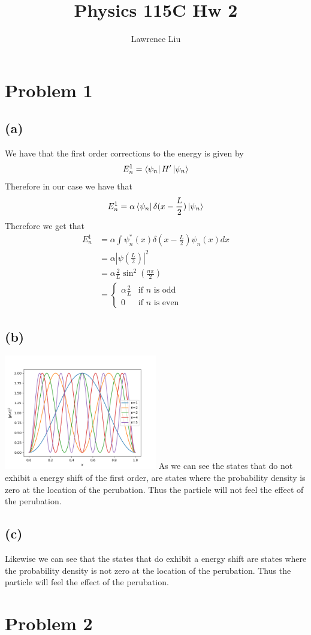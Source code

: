 \documentclass[11pt]{article}
\author{Lawrence Liu}
\title{Physics 115C Hw 2}
\begin{document}
\maketitle
\section*{Problem 1}
\subsection*{(a)}
We have that the first order corrections to the energy is given by 
$$
E_{n}^{1}=\bra{\psi_n}H'\ket{\psi_n}
$$
Therefore in our case we have that 
$$
    E_{n}^{1}=\alpha\bra{\psi_n}\delta(x-\frac{L}{2})\ket{\psi_n}
$$
Therefore we get that 
\begin{align*}
    E_{n}^{1}&=\alpha\int
    \psi_n^*(x) \delta(x-\frac{L}{2})\psi_n(x)dx\\
    &=\alpha |\psi(\frac{L}{2})|^2 \\
    &= \alpha \frac{2}{L} \sin^2\left(\frac{n\pi}{2}\right)\\
    &=\begin{cases}
    \alpha \frac{2}{L} & \text{if $n$ is odd}\\
    0 & \text{if $n$ is even}
    \end{cases}
\end{align*}
\subsection*{(b)}
\includegraphics*[width=0.5\textwidth]{wavefunction.png}
As we can see the states that do not exhibit a energy 
shift of the first order, are states where the probability
density is zero at the location of the perubation. Thus the 
particle will not feel the effect of the perubation.
\subsection*{(c)}
Likewise we can see that the states that do exhibit a energy
shift are states where the probability density is not zero at the
location of the perubation. Thus the particle will feel the effect
of the perubation.
\section*{Problem 2}
\end{document}
